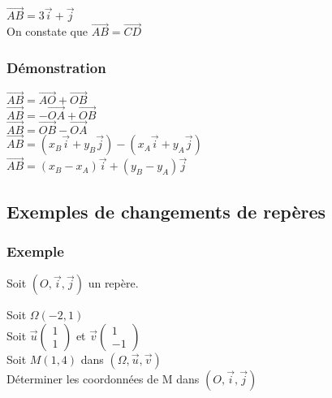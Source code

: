 $ \overrightarrow{AB} = 3\vec{i} + \vec{j}$\\

On constate que $\overrightarrow{AB} = \overrightarrow{CD}$\\

\subsubsection{Démonstration}

$\overrightarrow{AB} = \overrightarrow{AO} + \overrightarrow{OB} $\\

$ \overrightarrow{AB} = -\overrightarrow{OA} + \overrightarrow{OB} $\\

$ \overrightarrow{AB} = \overrightarrow{OB} - \overrightarrow{OA} $\\

$ \overrightarrow{AB} = \left( x_B \vec{i} + y_B\vec{j} \right) - \left( x_A\vec{i} + y_A\vec{j} \right) $\\

$ \overrightarrow{AB} = \left(x_B - x_A\right) \vec{i} + \left(y_B - y_A\right) \vec{j} $\\
\newpage
\subsection{Exemples de changements de repères}

\subsubsection{Exemple }

Soit $\left(O,\vec{i}, \vec{j}\right)$ un repère.\

Soit $\Omega\left(-2,1\right)$\\

Soit $\vec{u} \left(\begin{array}{c} 1\\ 1 \end{array}\right) $ et $\vec{v} \left(\begin{array}{c} 1\\ -1 \end{array}\right)$\\

Soit $M\left(1,4\right)$ dans $\left(\Omega,\vec{u}, \vec{v}\right) $\\

Déterminer les coordonnées de M dans $\left(O, \vec{i}, \vec{j}\right)$\\

